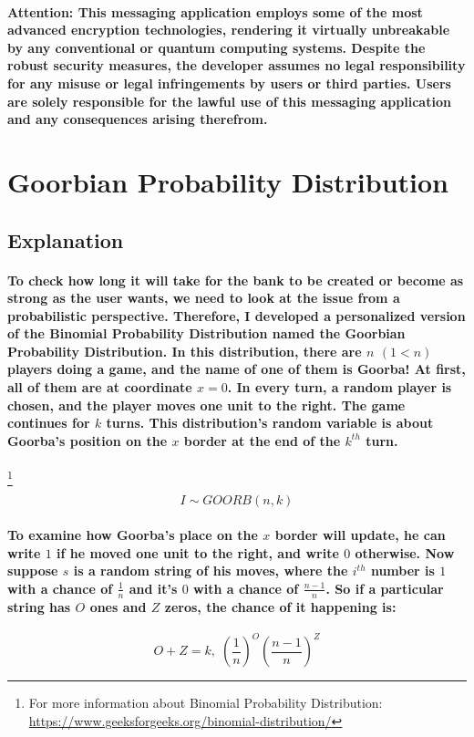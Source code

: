 \documentclass[oneside]{book}
\newcommand{\myparagraph}[1]{\paragraph{\textnormal{#1}}}
\begin{document}
\myparagraph{
\textbf{Attention:}\newline
This messaging application employs some of the most advanced encryption technologies, rendering it virtually unbreakable by any conventional or quantum computing systems. Despite the robust security measures, the developer assumes no legal responsibility for any misuse or legal infringements by users or third parties. Users are solely responsible for the lawful use of this messaging application and any consequences arising therefrom.
}

\newpage

\section{Goorbian Probability Distribution}

\subsection{Explanation}

\myparagraph{
To check how long it will take for the bank to be created or become as strong as the user wants, we need to look at the issue from a probabilistic perspective. Therefore, I developed a personalized version of the \textbf{Binomial Probability Distribution} named the \textbf{Goorbian Probability Distribution}. In this distribution, there are $n$ $(1 < n)$ players doing a game, and the name of one of them is \textbf{Goorba}! At first, all of them are at coordinate $x = 0$. In every turn, a random player is chosen, and the player moves one unit to the right. The game continues for $k$ turns. This distribution's random variable is about Goorba's position on the $x$ border at the end of the $k^{th}$ turn.
}
\footnote{
For more information about Binomial Probability Distribution:\newline
\href{https://www.geeksforgeeks.org/binomial-distribution/}{https://www.geeksforgeeks.org/binomial-distribution/}
}

$$I \sim GOORB(n, k)$$

\myparagraph{
To examine how Goorba's place on the $x$ border will update, he can write $1$ if he moved one unit to the right, and write $0$ otherwise. Now suppose $s$ is a random string of his moves, where the $i^{th}$ number is $1$ with a chance of $\frac{1}{n}$ and it's $0$ with a chance of $\frac{n - 1}{n}$. So if a particular string has $O$ ones and $Z$ zeros, the chance of it happening is:
}

$$O + Z = k, \; (\frac{1}{n})^O (\frac{n - 1}{n}) ^ Z$$ 
\end{document}
